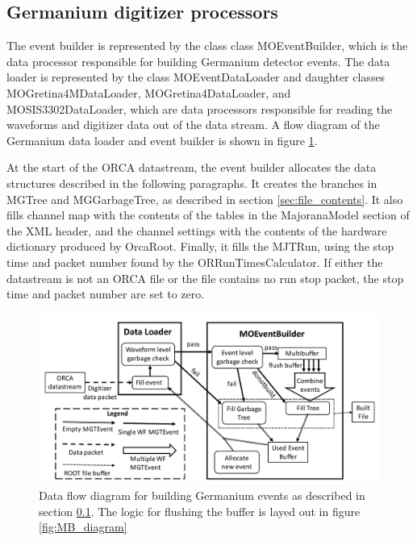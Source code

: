\documentclass[/main.tex]{subfiles}
\begin{document}
\subsection{Germanium digitizer processors} \label{sec:EB_description}
The event builder is represented by the class class MOEventBuilder, which is the data processor responsible for building Germanium detector events.
The data loader is represented by the class MOEventDataLoader and daughter classes MOGretina4MDataLoader, MOGretina4DataLoader, and MOSIS3302DataLoader, which are data processors responsible for reading the waveforms and digitizer data out of the data stream.
A flow diagram of the Germanium data loader and event builder is shown in figure \ref{fig:EB_diagram}.
\par
At the start of the ORCA datastream, the event builder allocates the data structures described in the following paragraphs.
It creates the branches in MGTree and MGGarbageTree, as described in section \ref{sec:file_contents}.
It also fills channel map with the contents of the tables in the MajoranaModel section of the XML header, and the channel settings with the contents of the hardware dictionary produced by OrcaRoot.
Finally, it fills the MJTRun, using the stop time and packet number found by the ORRunTimesCalculator.
If either the datastream is not an ORCA file or the file contains no run stop packet, the stop time and packet number are set to zero.
\par

\begin{figure}
  \centering
  \includegraphics[width=.9\textwidth]{EventBuilderDiagram}
  \caption[Event builder data flow diagram]{\label{fig:EB_diagram}
    Data flow diagram for building Germanium events as described in section \ref{sec:EB_description}. The logic for flushing the buffer is layed out in figure \ref{fig:MB_diagram}}
\end{figure}
\end{document}
